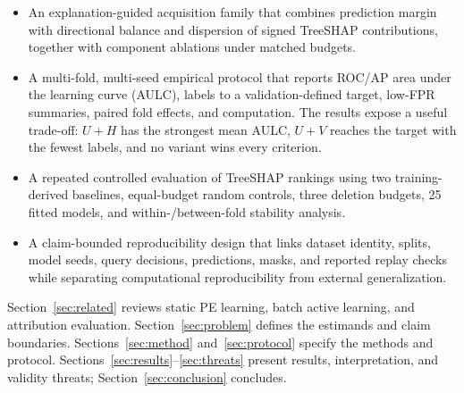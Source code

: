 \begin{itemize}
    \item An explanation-guided acquisition family that combines prediction
    margin with directional balance and dispersion of signed TreeSHAP
    contributions, together with component ablations under matched budgets.
    \item A multi-fold, multi-seed empirical protocol that reports ROC/AP area
    under the learning curve (AULC), labels to a validation-defined target,
    low-FPR summaries, paired fold effects, and computation. The results expose a
    useful trade-off: $U+H$ has the strongest mean AULC, $U+V$ reaches the target
    with the fewest labels, and no variant wins every criterion.
    \item A repeated controlled evaluation of TreeSHAP rankings using two
    training-derived baselines, equal-budget random controls, three deletion
    budgets, 25 fitted models, and within-/between-fold stability analysis.
    \item A claim-bounded reproducibility design that links dataset identity,
    splits, model seeds, query decisions, predictions, masks, and reported replay
    checks while separating computational reproducibility from external
    generalization.
\end{itemize}

Section~\ref{sec:related} reviews static PE learning, batch active learning, and
attribution evaluation. Section~\ref{sec:problem} defines the estimands and claim
boundaries. Sections~\ref{sec:method} and~\ref{sec:protocol} specify the methods
and protocol. Sections~\ref{sec:results}--\ref{sec:threats} present results,
interpretation, and validity threats; Section~\ref{sec:conclusion} concludes.


